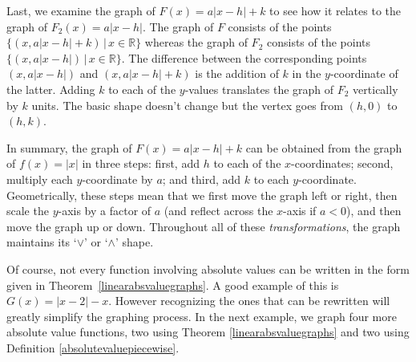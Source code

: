 \medskip

Last, we examine the graph of $F(x) = a|x - h| + k$ to see how it relates to the graph of $F_{2}(x) = a|x - h|$.  The graph of $F$ consists of the points $\{ (x, a|x - h| + k ) \, | \, x \in \mathbb{R} \}$ whereas the graph of $F_{2}$ consists of the points $\{ (x, a|x - h|) \, | \, x \in \mathbb{R} \}$.  The difference between the corresponding points $(x, a|x - h|)$ and $(x, a|x - h| + k )$ is the addition of $k$ in the $y$-coordinate of the latter.  Adding $k$ to each of the $y$-values translates the graph of $F_{2}$ vertically by $k$ units.  The basic shape doesn't change but the vertex goes from $(h, 0)$ to $(h, k)$.

\medskip

In summary, the graph of $F(x) = a|x - h| + k$ can be obtained from the graph of $f(x) = |x|$ in three steps:  first, add $h$ to each of the $x$-coordinates;  second, multiply each $y$-coordinate by $a$; and third, add $k$ to each $y$-coordinate.  Geometrically, these steps mean that we first move the graph left or right, then scale the $y$-axis by a factor of $a$ (and reflect across the $x$-axis if $a < 0$), and then move the graph up or down.  Throughout all of these \textit{transformations}, the graph maintains its `$\vee$' or `$\wedge$' shape.

\medskip

Of course, not every function involving absolute values can be written in the form given in Theorem~\ref{linearabsvaluegraphs}. A good example of this is $G(x) = |x - 2| - x$.  However recognizing the ones that can be rewritten will greatly simplify the graphing process. In the next example, we graph four more absolute value functions, two using Theorem \ref{linearabsvaluegraphs} and two using Definition \ref{absolutevaluepiecewise}.

\enlargethispage{.05in}

